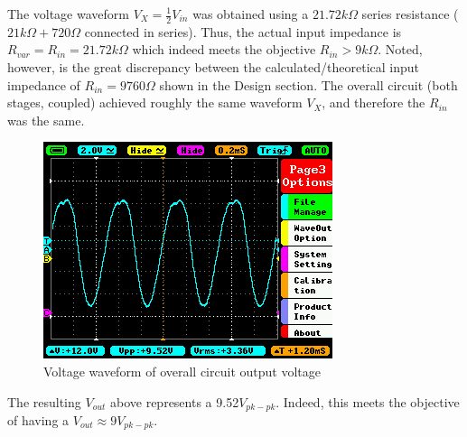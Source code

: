 \documentclass[12pt]{article}
\begin{document}
The voltage waveform $V_X = \frac{1}{2}V_{in}$ was obtained using a $21.72k\Omega$ series resistance ($21k\Omega + 720\Omega$ connected in series). Thus, the actual input impedance is $R_{var} = R_{in} = 21.72k\Omega$ which indeed meets the objective $R_{in} > 9k\Omega$. Noted, however, is the great discrepancy between the calculated/theoretical input impedance of $R_{in} = 9760\Omega$ shown in the Design section. The overall circuit (both stages, coupled) achieved roughly the same waveform $V_X$, and therefore the $R_{in}$ was the same.

\begin{figure}[H]
    \centering
    \includegraphics{Lab2/9VPP.png}
    \caption{Voltage waveform of overall circuit output voltage}
\end{figure}

The resulting $V_{out}$ above represents a 9.52$V_{pk-pk}$. Indeed, this meets the objective of having a $V_{out} \approx 9 V_{pk-pk}$.
\end{document}
